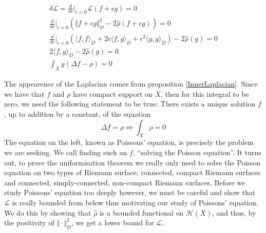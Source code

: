\documentclass[11pt]{report}
\theoremstyle{definition}
\begin{document}
\begin{gather*}
  \delta \mathcal{L} = \frac{d}{d\epsilon}\biggr\rvert_{\epsilon = 0}\mathcal{L}(f+\epsilon g) = 0 \\
  \frac{d}{d\epsilon}\biggr\rvert_{\epsilon = 0}(\Vert f+\epsilon g\Vert _D^2 -2\hat{\rho}(f+\epsilon g)) = 0 \\
  \frac{d}{d\epsilon}\biggr\rvert_{\epsilon = 0}(\langle f, f \rangle_D + 2\epsilon \langle f, g \rangle_D +\epsilon^2 \langle g, g \rangle_D) -2 \hat{\rho}(g) = 0 \\
  2\langle f, g \rangle_D -2\hat{\rho}(g) = 0 \\
  \int_X g(\Delta f - \rho) = 0 
\end{gather*}

The appearence of the Laplacian comes from proposition \ref{InnerLaplacian}.
Since we have that $f$ and $\rho$ have compact support on $X$, then for this integral to be zero, we need the following statement to be true: There exists a unique solution $f$, up to addition by a constant, of the equation 
\[ \Delta f = \rho \Longleftrightarrow \int_X \rho = 0\]
The equation on the left, known as Poissons' equation, is precisely the problem we are seeking. We call finding such an $f$, ``solving the Poisson equation''. It turns out, to prove the uniformisation theorem we really only need to solve the Poisson equation on two types of Riemann surface; connected, compact Riemann surfaces and connected, simply-connected, non-compact Riemann surfaces. Before we study Poissons' equation too deeply however, we must be careful and show that $\mathcal{L}$ is really bounded from below thus motivating our study of Poissons' equation.  We do this by showing that $\hat{\rho}$ is a bounded functional on $\mathcal{H}(X)$, and thus, by the positivity of $\Vert \cdot \Vert^2_D$, we get a lower bound for $\mathcal{L}$.
\end{document}
